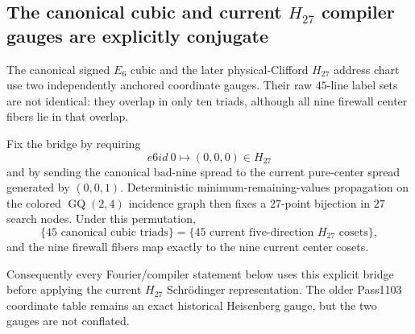 \subsection*{The canonical cubic and current $H_{27}$ compiler gauges are explicitly conjugate}

The canonical signed $E_6$ cubic and the later physical-Clifford $H_{27}$
address chart use two independently anchored coordinate gauges. Their raw
$45$-line label sets are not identical: they overlap in only ten triads,
although all nine firewall center fibers lie in that overlap.

Fix the bridge by requiring
\[
  e6id\ 0\longmapsto (0,0,0)\in H_{27}
\]
and by sending the canonical bad-nine spread to the current pure-center spread
generated by $(0,0,1)$. Deterministic minimum-remaining-values propagation on
the colored $\operatorname{GQ}(2,4)$ incidence graph then fixes a $27$-point
bijection in $27$ search nodes. Under this permutation,
\[
  \{\text{45 canonical cubic triads}\}
  =
  \{\text{45 current five-direction }H_{27}\text{ cosets}\},
\]
and the nine firewall fibers map exactly to the nine current center cosets.

Consequently every Fourier/compiler statement below uses this explicit bridge
before applying the current $H_{27}$ Schrödinger representation. The older
Pass1103 coordinate table remains an exact historical Heisenberg gauge, but
the two gauges are not conflated.
